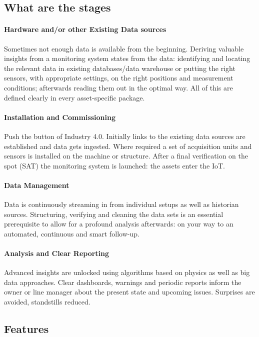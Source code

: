 \subsection{What are the stages}

\paragraph{Hardware and/or other Existing Data sources}
Sometimes not enough data is available from the beginning. Deriving valuable insights from a monitoring system states from the data:
identifying and locating the relevant data in existing databases/data warehouse or putting the right sensors, with appropriate settings, on the right positions and 
measurement conditions; afterwards reading them out in the optimal way. All of this are defined clearly in every asset-specific package.

\paragraph{Installation and Commissioning}
Push the button of Industry 4.0. Initially links to the existing data sources are established and data gets ingested. 
Where required a set of acquisition units and sensors is installed on the machine or structure.
After a final verification on the spot (SAT) the monitoring system is launched: the assets enter the IoT.

\paragraph{Data Management}
Data is continuously streaming in from individual setups as well as historian sources. 
Structuring, verifying and cleaning the data sets is an essential prerequisite to allow for a profound analysis afterwards: on your way to an automated, continuous and smart follow-up.

\paragraph{Analysis and Clear Reporting}
Advanced insights are unlocked using algorithms based on physics as well as big data approaches. 
Clear dashboards, warnings and periodic reports inform the owner or line manager about the present state and upcoming issues. Surprises are avoided, standstills reduced.

\subsection{Features}
